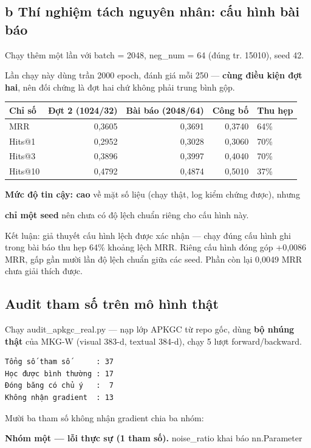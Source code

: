 \documentclass[11pt,a4paper]{article}
\newcommand{\code}[1]{{\ttfamily\small\color{codetext}#1}}
\begin{document}
\subsection{b Thí nghiệm tách nguyên nhân: cấu hình bài báo}
Chạy thêm một lần với \code{batch = 2048}, \code{neg\_num = 64} (đúng tr. 15010), seed 42.

Lần chạy này dùng trần 2000 epoch, đánh giá mỗi 250 --- \textbf{cùng điều kiện đợt hai}, nên đối chứng là đợt hai chứ không phải trung bình gộp.

\begin{center}\small
\begin{tabular}{@{}lrrrl@{}}
\toprule
\textbf{Chỉ số} & \textbf{Đợt 2 (1024/32)} & \textbf{Bài báo (2048/64)} & \textbf{Công bố} & \textbf{Thu hẹp}\\
\midrule
MRR & 0,3605 & 0,3691 & 0,3740 & 64\%\\
Hits@1 & 0,2952 & 0,3028 & 0,3060 & 70\%\\
Hits@3 & 0,3896 & 0,3997 & 0,4040 & 70\%\\
Hits@10 & 0,4792 & 0,4874 & 0,5010 & 37\%\\
\bottomrule
\end{tabular}
\end{center}
\textbf{Mức độ tin cậy: cao} về mặt số liệu (chạy thật, log kiểm chứng được), nhưng

\textbf{chỉ một seed} nên chưa có độ lệch chuẩn riêng cho cấu hình này.

Kết luận: giả thuyết cấu hình lệch được xác nhận --- chạy đúng cấu hình ghi trong bài báo thu hẹp 64\% khoảng lệch MRR. Riêng cấu hình đóng góp +0,0086 MRR, gấp gần mười lần độ lệch chuẩn giữa các seed. Phần còn lại 0,0049 MRR chưa giải thích được.

\subsection{Audit tham số trên mô hình thật}
Chạy \code{audit\_apkgc\_real.py} --- nạp lớp \code{APKGC} từ repo gốc, dùng \textbf{bộ nhúng thật} của MKG-W (visual 383-d, textual 384-d), chạy 5 lượt forward/backward.

\begin{lstlisting}
Tổng số tham số      : 37
Học được bình thường : 17
Đóng băng có chủ ý   :  7
Không nhận gradient  : 13
\end{lstlisting}
Mười ba tham số không nhận gradient chia ba nhóm:

\textbf{Nhóm một --- lỗi thực sự (1 tham số).} \code{noise\_ratio} khai báo \code{nn.Parameter}
\end{document}
